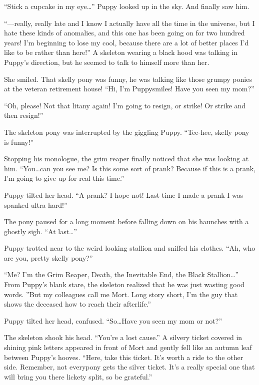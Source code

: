 
``Stick a cupcake in my eye\dots'' Puppy looked up in the sky. And finally saw him.

``---really, really late and I know I actually have all the time in the universe, but I hate these kinds of anomalies, and this one has been going on for two hundred years! I'm beginning to lose my cool, because there are a lot of better places I'd like to be rather than here!'' A skeleton wearing a black hood was talking in Puppy's direction, but he seemed to talk to himself more than her.

She smiled. That skelly pony was funny, he was talking like those grumpy ponies at the veteran retirement house! ``Hi, I'm Puppysmiles! Have you seen my mom?''

``Oh, please! Not that litany again! I'm going to resign, or strike! Or strike and then resign!''

The skeleton pony was interrupted by the giggling Puppy. ``Tee-hee, skelly pony is funny!''

Stopping his monologue, the grim reaper finally noticed that she was looking at him. ``You\dots can you see me? Is this some sort of prank? Because if this is a prank, I'm going to give up for real this time.''

Puppy tilted her head. ``A prank? I hope not! Last time I made a prank I was spanked ultra hard!''

The pony paused for a long moment before falling down on his haunches with a ghostly sigh. ``At last\dots''

Puppy trotted near to the weird looking stallion and sniffed his clothes. ``Ah, who are you, pretty skelly pony?''

``Me? I'm the Grim Reaper, Death, the Inevitable End, the Black Stallion\dots'' From Puppy's blank stare, the skeleton realized that he was just wasting good words. ''But my colleagues call me Mort. Long story short, I'm the guy that shows the deceased how to reach their afterlife.''

Puppy tilted her head, confused. ``So\dots Have you seen my mom or not?''

The skeleton shook his head. ``You're a lost cause.'' A silvery ticket covered in shining pink letters appeared in front of Mort and gently fell like an autumn leaf between Puppy's hooves. ``Here, take this ticket. It's worth a ride to the other side. Remember, not everypony gets the silver ticket. It's a really special one that will bring you there lickety split, so be grateful.''

